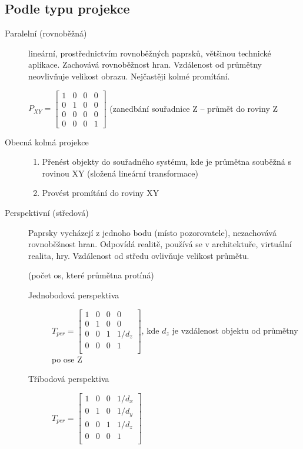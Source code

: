 \documentclass[a4paper, 11pt]{report}
\begin{document}
\subsection{Podle typu projekce}
\begin{description}
	\item[Paralelní (rovnoběžná)] lineární, prostřednictvím rovnoběžných paprsků, většinou technické aplikace. Zachovává rovnoběžnost hran. Vzdálenost od průmětny neovlivňuje velikost obrazu. Nejčastěji kolmé promítání.
	
	$P_{XY} = \begin{bmatrix}
		1 & 0 & 0 & 0 \\
		0 & 1 & 0 & 0 \\
		0 & 0 & 0 & 0 \\
		0 & 0 & 0 & 1
	\end{bmatrix}$ (zanedbání souřadnice Z -- průmět do roviny Z
	
	\item[Obecná kolmá projekce] \hfill
	\begin{enumerate}
		\item Přenést objekty do souřadného systému, kde je průmětna souběžná s rovinou XY (složená lineární transformace)
		\item Provést promítání do roviny XY
	\end{enumerate}
	\item[Perspektivní (středová)] Paprsky vycházejí z jednoho bodu (místo pozorovatele), nezachovává rovnoběžnost hran. Odpovídá realitě, používá se v architektuře, virtuální realita, hry. Vzdálenost od středu ovlivňuje velikost průmětu.
	
	(počet os, které průmětna protíná) 
	\begin{description}
		\item[Jednobodová perspektiva]$T_{per} = \begin{bmatrix}
		1 & 0 & 0 & 0 \\
		0 & 1 & 0 & 0 \\
		0 & 0 & 1 & 1/d_z \\
		0 & 0 & 0 & 1 \\
		\end{bmatrix}$, kde $d_z$ je vzdálenost objektu od průmětny po ose Z
		
		\item[Tříbodová perspektiva] $T_{per} = \begin{bmatrix}
		1 & 0 & 0 & 1/d_x \\
		0 & 1 & 0 & 1/d_y \\
		0 & 0 & 1 & 1/d_z \\
		0 & 0 & 0 & 1 \\
		\end{bmatrix}$
	\end{description}
\end{description}
\end{document}
